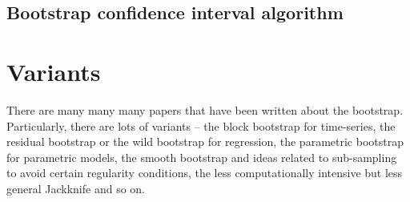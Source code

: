 \documentclass[twoside,12pt]{article}
\begin{document}
\subsection{Bootstrap confidence interval algorithm}

\section{Variants}
There are many many many papers that have been written about the bootstrap. Particularly, there are lots of variants -- the block bootstrap for time-series, the residual bootstrap or the wild bootstrap for regression, the parametric bootstrap for parametric models, the smooth bootstrap and ideas related to sub-sampling to avoid certain regularity conditions, the less computationally intensive but less general Jackknife and so on. 

%
%
%
%
%
%
%
%
%
%
%
\end{document}
